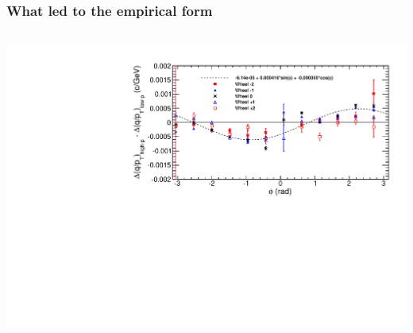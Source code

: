 \documentclass[compress]{beamer}
\begin{document}
\begin{frame}
\frametitle{What led to the empirical form}

\begin{columns}

\includegraphics[width=\linewidth]{deltacurv_vs_phi.pdf}


\end{columns}
\end{frame}
\end{document}
